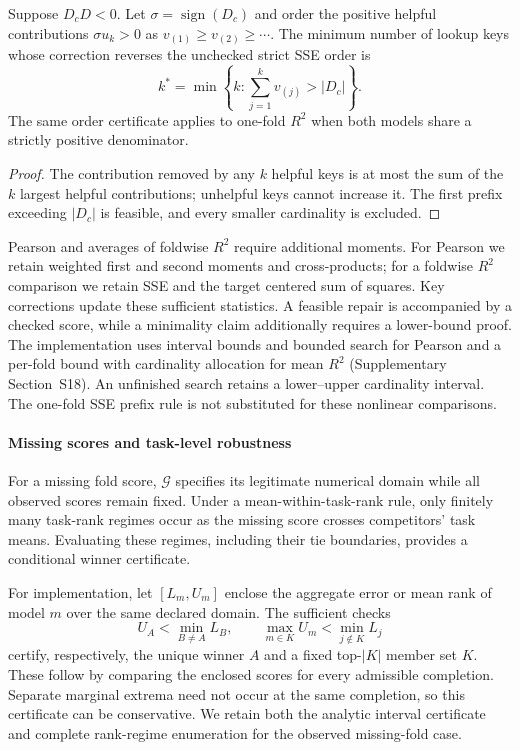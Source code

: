 \begin{proposition}\label{prop:minrepair}
Suppose $D_cD<0$. Let $\sigma=\operatorname{sign}(D_c)$ and order the positive helpful contributions $\sigma u_k>0$ as $v_{(1)}\ge v_{(2)}\ge\cdots$. The minimum number of lookup keys whose correction reverses the unchecked strict SSE order is
\begin{equation}\label{eq:minkeys}
k^*=\min\left\{k:\sum_{j=1}^kv_{(j)}>|D_c|\right\}.
\end{equation}
The same order certificate applies to one-fold $R^2$ when both models share a strictly positive denominator.
\end{proposition}
\begin{proof}
The contribution removed by any $k$ helpful keys is at most the sum of the $k$ largest helpful contributions; unhelpful keys cannot increase it. The first prefix exceeding $|D_c|$ is feasible, and every smaller cardinality is excluded.
\end{proof}

Pearson and averages of foldwise $R^2$ require additional moments. For Pearson we retain weighted first and second moments and cross-products; for a foldwise $R^2$ comparison we retain SSE and the target centered sum of squares. Key corrections update these sufficient statistics. A feasible repair is accompanied by a checked score, while a minimality claim additionally requires a lower-bound proof. The implementation uses interval bounds and bounded search for Pearson and a per-fold bound with cardinality allocation for mean $R^2$ (Supplementary Section~S18). An unfinished search retains a lower--upper cardinality interval. The one-fold SSE prefix rule is not substituted for these nonlinear comparisons.

\paragraph{Missing scores and task-level robustness}
For a missing fold score, $\mathcal G$ specifies its legitimate numerical domain while all observed scores remain fixed. Under a mean-within-task-rank rule, only finitely many task-rank regimes occur as the missing score crosses competitors' task means. Evaluating these regimes, including their tie boundaries, provides a conditional winner certificate.

For implementation, let $[L_m,U_m]$ enclose the aggregate error or mean rank of model $m$ over the same declared domain. The sufficient checks
\begin{equation}\label{eq:intervalcert}
 U_A<\min_{B\ne A}L_B,\qquad
 \max_{m\in K}U_m<\min_{j\notin K}L_j
\end{equation}
certify, respectively, the unique winner $A$ and a fixed top-$|K|$ member set $K$. These follow by comparing the enclosed scores for every admissible completion. Separate marginal extrema need not occur at the same completion, so this certificate can be conservative. We retain both the analytic interval certificate and complete rank-regime enumeration for the observed missing-fold case.

